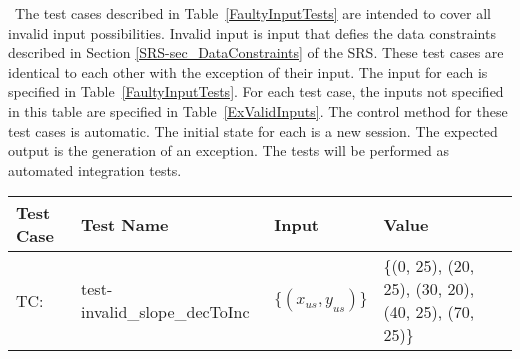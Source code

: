 \documentclass[12pt, titlepage]{article}
\newcounter{testnum} %
\begin{document}
~\newline \noindent The test cases described in Table~\ref{FaultyInputTests} 
are intended to cover all invalid input possibilities. Invalid input is input 
that defies the data constraints described in Section 
\ref{SRS-sec_DataConstraints} of the SRS. These test cases are identical to 
each other with the exception of their input. The input for each is specified 
in Table~\ref{FaultyInputTests}. For each test case, the inputs not specified 
in this table are specified in Table~\ref{ExValidInputs}. The control method 
for these test cases is automatic. The initial state for each is a new session. 
The expected output is the generation of an exception. The tests will be 
performed as automated integration tests.

\begin{longtable*}{  l  p{5cm}  l  p{5cm}  }
	\hline
	\textbf{Test Case} & \textbf{Test Name} & \textbf{Input} & \textbf{Value} \\
	\hline
	TC\thetestnum: \label{TC_InvalidSlopeDecToInc} & 
	test-invalid\_slope\_decToInc & 
	$\{\left(x_{us},y_{us}\right)\}$ & \{(0, 25), 
	(20, 25), (30, 20), (40, 25), (70, 25)\}\\
	\hline
\end{longtable*}
\end{document}
